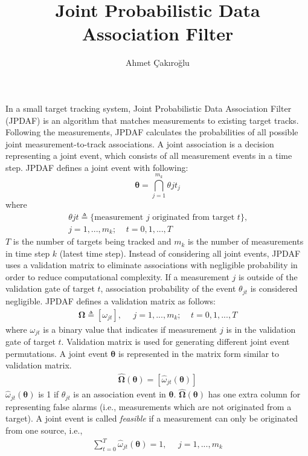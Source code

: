 \documentclass{article}
\title{Joint Probabilistic Data Association Filter}
\author{Ahmet Çakıroğlu}
\date{}
\newcommand{\btheta}{\boldsymbol{\theta}}
\begin{document}
\maketitle
In a small target tracking system, Joint Probabilistic Data Association Filter (JPDAF) is an algorithm that matches measurements to existing target tracks. Following the measurements, JPDAF calculates the probabilities of all possible joint measurement-to-track associations. A joint association is a decision representing a joint event, which consists of all measurement events in a time step. JPDAF defines a joint event with following:
\begin{equation}
\btheta=\bigcap_{j=1}^{m_k}{\theta{jt_j}}
\end{equation}
where
\begin{gather}\nonumber
{\theta{jt}}\triangleq \text{\{measurement $j$ originated from target $t$\},}\\
j=1,...,m_k;~~~~~t=0,1,...,T
\end{gather}
$T$ is the number of targets being tracked and $m_k$ is the number of measurements in time step $k$ (latest time step). Instead of considering all joint events, JPDAF uses a validation matrix to eliminate associations with negligible probability in order to reduce computational complexity. If a measurement $j$ is outside of the validation gate of target $t$, association probability of the event $\theta_{jt}$ is considered negligible. JPDAF defines a validation matrix as follows:
\begin{gather}
\boldsymbol{\Omega}\triangleq[\omega_{jt}],~~~~~~j=1,...,m_k;~~~~~t=0,1,...,T
\end{gather}
where $\omega_{jt}$ is a binary value that indicates if measurement $j$ is in the validation gate of target $t$. Validation matrix is used for generating different joint event permutations. A joint event $\btheta$ is represented in the matrix form similar to validation matrix. 
\begin{gather}
\hat{\boldsymbol{\Omega}}(\btheta)=[\hat{\omega}_{jt}(\btheta)]
\end{gather}
$\hat{\omega}_{jt}(\btheta)$ is 1 if $\theta_{jt}$ is an association event in $\btheta$. $\hat{\boldsymbol{\Omega}}(\btheta)$ has one extra column for representing false alarms (i.e., measurements which are not originated from a target).
A joint event is called \textit{feasible} if a measurement can only be originated from one source, i.e.,
\begin{gather}
\sum_{t=0}^{T}\hat{\omega}_{jt}(\btheta)=1,~~~~~~j=1,...,m_k
\end{gather}
\end{document}
